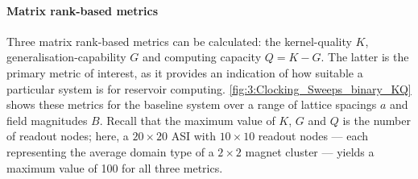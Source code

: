 \paragraph{Matrix rank-based metrics}
Three matrix rank-based metrics can be calculated: the kernel-quality $K$, generalisation-capability $G$ and computing capacity $Q=K-G$.
The latter is the primary metric of interest, as it provides an indication of how suitable a particular system is for reservoir computing.
\cref{fig:3:Clocking_Sweeps_binary_KQ} shows these metrics for the baseline system over a range of lattice spacings $a$ and field magnitudes $B$.
Recall that the maximum value of $K$, $G$ and $Q$ is the number of readout nodes; here, a $20 \times 20$ ASI with $10 \times 10$ readout nodes --- each representing the average domain type of a $2 \times 2$ magnet cluster --- yields a maximum value of 100 for all three metrics.


